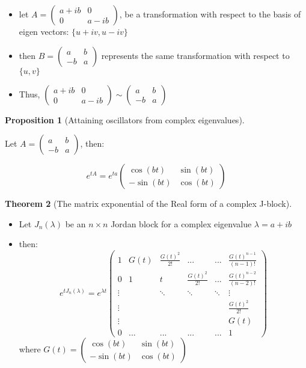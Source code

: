 \documentclass{article}
\newtheorem{thm}{Theorem}[section]
\newtheorem{prop}[thm]{Proposition}
\begin{document}
\begin{itemize}
    \item let $A = \begin{pmatrix}
        a + ib & 0 \\
        0 & a - ib
    \end{pmatrix}$, be a transformation with respect to the basis of eigen vectors: $\{u + iv, u - iv\}$

    \item then $B = \begin{pmatrix}
        a & b \\
        -b  & a
    \end{pmatrix}$ represents the same transformation with respect to $\{u, v\}$

    \item Thus, $\begin{pmatrix}
        a + ib & 0 \\
        0 & a - ib
    \end{pmatrix} \sim \begin{pmatrix}
        a & b \\
        -b  & a
    \end{pmatrix}$
\end{itemize}

\begin{prop}[Attaining oscillators from complex eigenvalues]
\end{prop}
Let $A = \begin{pmatrix}
    a & b \\
    -b  & a
\end{pmatrix}$, then:

\[e^{tA} = e^{ta}\begin{pmatrix}
    \cos(bt) & \sin(bt) \\
    -\sin(bt)  & \cos(bt)
\end{pmatrix}\]

\newpage
\begin{thm}[The matrix exponential of the Real form of a complex J-block]
\end{thm}
\begin{itemize}
    \item Let $J_n(\lambda)$ be an $n\times n$ Jordan block for a complex eigenvalue $\lambda = a + ib$
    \item then:
    \[e^{tJ_n(\lambda)} = e^{\lambda t}\begin{pmatrix}
        1 & G(t) & \frac{G(t)^2}{2!} &...&...& \frac{G(t)^{n-1}}{(n-1)!}\\
    0 & 1 & t & \frac{G(t)^2}{2!} & ... &\frac{G(t)^{n-2}}{(n-2)!} \\
    \vdots & & \ddots & \ddots &\ddots & \vdots\\
    \vdots&&&&&\frac{G(t)^2}{2!}\\
    \vdots&&&&&G(t)\\
    0 &...&...&...&...& 1
    \end{pmatrix}\]
    where  $G(t) = \begin{pmatrix}
        \cos(bt) & \sin(bt)\\
        -\sin(bt)  & \cos(bt)
    \end{pmatrix}$
\end{itemize}
\end{document}
